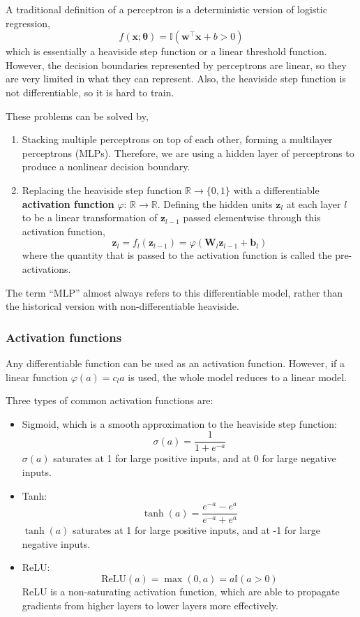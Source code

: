 \documentclass[11pt]{article}
\begin{document}
A traditional definition of a perceptron is a deterministic version of logistic regression,
\[
f(\boldsymbol{x}; \boldsymbol{\theta}) = \mathbb{I}(\boldsymbol{w}^\top \boldsymbol{x} + b > 0)
\]
which is essentially a heaviside step function or a linear threshold function.
However, the decision boundaries represented by perceptrons are linear, so they are very limited in what they can represent.
Also, the heaviside step function is not differentiable, so it is hard to train.

These problems can be solved by,
\begin{enumerate}
    \item Stacking multiple perceptrons on top of each other, forming a multilayer perceptrons (MLPs). Therefore, we are using a hidden layer of perceptrons to produce a nonlinear decision boundary.
    \item Replacing the heaviside step function $\mathbb{R} \to \{0,1\}$ with a differentiable \textbf{activation function} $\varphi: \, \mathbb{R} \to \mathbb{R}$.
    Defining the hidden units $\boldsymbol{z}_l$ at each layer $l$ to be a linear transformation of $\boldsymbol{z}_{l-1}$ passed elementwise through this activation function,
    \[
    \boldsymbol{z}_l = f_l(\boldsymbol{z}_{l-1}) = \varphi(\mathbf{W}_l \boldsymbol{z}_{l-1} + \boldsymbol{b}_l)
    \]
    where the quantity that is passed to the activation function is called the pre-activations.
\end{enumerate}
The term “MLP” almost always refers to this differentiable model, rather than the historical version with non-differentiable heaviside.

\subsubsection*{Activation functions}
Any differentiable function can be used as an activation function. However, if a linear function $\varphi(a) = c_l a$ is used, the whole model reduces to a linear model.

Three types of common activation functions are:
\begin{itemize}
    \item Sigmoid, which is a smooth approximation to the heaviside step function:
    \[
    \sigma(a) = \frac{1}{1 + e^{-a}}
    \]
    $\sigma(a)$ saturates at 1 for large positive inputs, and at 0 for large negative inputs.
    \item Tanh:
    \[
    \tanh(a) = \frac{e^{-a} - e^{a}}{e^{-a} + e^{a}}
    \]
    $\tanh(a)$ saturates at 1 for large positive inputs, and at -1 for large negative inputs.
    \item ReLU: 
    \[
    \text{ReLU}(a) = \max(0,a) = a \mathbb{I}(a > 0)
    \]
    ReLU is a non-saturating activation function, which are able to propagate gradients from higher layers to lower layers more effectively.
\end{itemize}
\end{document}
